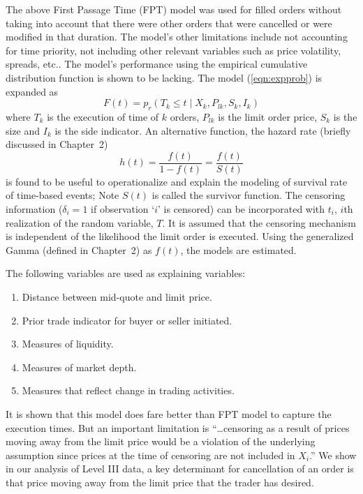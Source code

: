 The above First Passage Time (FPT) model was used for filled orders without taking into account that there were other orders that were cancelled or were modified in that duration. The model's other limitations include not accounting for time priority, not including other relevant variables such as price volatility, spreads, etc.. The model's performance using the empirical cumulative distribution function is shown to be lacking. The model (\ref{eqn:expprob}) is expanded as
	\begin{equation}\label{eqn:cumexpmodel}
	F(t)=p_r(T_k \leq t \;|\; X_k,P_{lk}, S_k, I_k)
	\end{equation}
where $T_k$ is the execution of time of $k$ orders, $P_{lk}$ is the limit order price, $S_k$ is the size and $I_k$ is the side indicator. An alternative function, the hazard rate (briefly discussed in Chapter~2)
	\begin{equation}\label{eqn:hazard}
	h(t)=\dfrac{f(t)}{1-f(t)}= \dfrac{f(t)}{S(t)}
	\end{equation}
is found to be useful to operationalize and explain the modeling of survival rate of time-based events; Note $S(t)$ is called the survivor function. The censoring information ($\delta_i=1$ if observation `$i$' is censored) can be incorporated with $t_i$, $i$th realization of the random variable, $T$. It is assumed that the censoring mechanism is independent of the likelihood the limit order is executed. Using the generalized Gamma (defined in Chapter~2) as $f(t)$, the models are estimated.


The following variables are used as explaining variables:
        \begin{enumerate}[--]
        \item Distance between mid-quote and limit price.
        \item Prior trade indicator for buyer or seller initiated.
        \item Measures of liquidity.
        \item Measures of market depth.
        \item Measures that reflect change in trading activities. 
        \end{enumerate}
It is shown that this model does fare better than FPT model to capture the execution times. But an important limitation is ``\dots censoring as a result of prices moving away from the limit price would be a violation of the underlying assumption since prices at the time of censoring are not included in $X_i$.'' We show in our analysis of Level III data, a key determinant for cancellation of an order is that price moving away from the limit price that the trader has desired. \\


